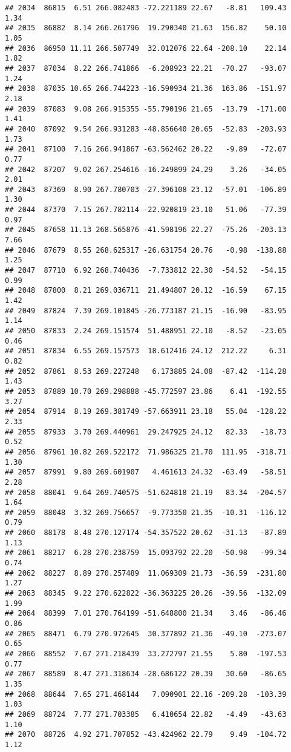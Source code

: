 \documentclass[]{article}
\begin{document}
\begin{verbatim}
## 2034  86815  6.51 266.082483 -72.221189 22.67   -8.81   109.43  1.34
## 2035  86882  8.14 266.261796  19.290340 21.63  156.82    50.10  1.05
## 2036  86950 11.11 266.507749  32.012076 22.64 -208.10    22.14  1.82
## 2037  87034  8.22 266.741866  -6.208923 22.21  -70.27   -93.07  1.24
## 2038  87035 10.65 266.744223 -16.590934 21.36  163.86  -151.97  2.18
## 2039  87083  9.08 266.915355 -55.790196 21.65  -13.79  -171.00  1.41
## 2040  87092  9.54 266.931283 -48.856640 20.65  -52.83  -203.93  1.73
## 2041  87100  7.16 266.941867 -63.562462 20.22   -9.89   -72.07  0.77
## 2042  87207  9.02 267.254616 -16.249899 24.29    3.26   -34.05  2.01
## 2043  87369  8.90 267.780703 -27.396108 23.12  -57.01  -106.89  1.30
## 2044  87370  7.15 267.782114 -22.920819 23.10   51.06   -77.39  0.97
## 2045  87658 11.13 268.565876 -41.598196 22.27  -75.26  -203.13  7.66
## 2046  87679  8.55 268.625317 -26.631754 20.76   -0.98  -138.88  1.25
## 2047  87710  6.92 268.740436  -7.733812 22.30  -54.52   -54.15  0.99
## 2048  87800  8.21 269.036711  21.494807 20.12  -16.59    67.15  1.42
## 2049  87824  7.39 269.101845 -26.773187 21.15  -16.90   -83.95  1.14
## 2050  87833  2.24 269.151574  51.488951 22.10   -8.52   -23.05  0.46
## 2051  87834  6.55 269.157573  18.612416 24.12  212.22     6.31  0.82
## 2052  87861  8.53 269.227248   6.173885 24.08  -87.42  -114.28  1.43
## 2053  87889 10.70 269.298888 -45.772597 23.86    6.41  -192.55  3.27
## 2054  87914  8.19 269.381749 -57.663911 23.18   55.04  -128.22  2.33
## 2055  87933  3.70 269.440961  29.247925 24.12   82.33   -18.73  0.52
## 2056  87961 10.82 269.522172  71.986325 21.70  111.95  -318.71  1.30
## 2057  87991  9.80 269.601907   4.461613 24.32  -63.49   -58.51  2.28
## 2058  88041  9.64 269.740575 -51.624818 21.19   83.34  -204.57  1.64
## 2059  88048  3.32 269.756657  -9.773350 21.35  -10.31  -116.12  0.79
## 2060  88178  8.48 270.127174 -54.357522 20.62  -31.13   -87.89  1.13
## 2061  88217  6.28 270.238759  15.093792 22.20  -50.98   -99.34  0.74
## 2062  88227  8.89 270.257489  11.069309 21.73  -36.59  -231.80  1.27
## 2063  88345  9.22 270.622822 -36.363225 20.26  -39.56  -132.09  1.99
## 2064  88399  7.01 270.764199 -51.648800 21.34    3.46   -86.46  0.86
## 2065  88471  6.79 270.972645  30.377892 21.36  -49.10  -273.07  0.65
## 2066  88552  7.67 271.218439  33.272797 21.55    5.80  -197.53  0.77
## 2067  88589  8.47 271.318634 -28.686122 20.39   30.60   -86.65  1.35
## 2068  88644  7.65 271.468144   7.090901 22.16 -209.28  -103.39  1.03
## 2069  88724  7.77 271.703385   6.410654 22.82   -4.49   -43.63  1.10
## 2070  88726  4.92 271.707852 -43.424962 22.79    9.49  -104.72  1.12

\end{verbatim}
\end{document}
